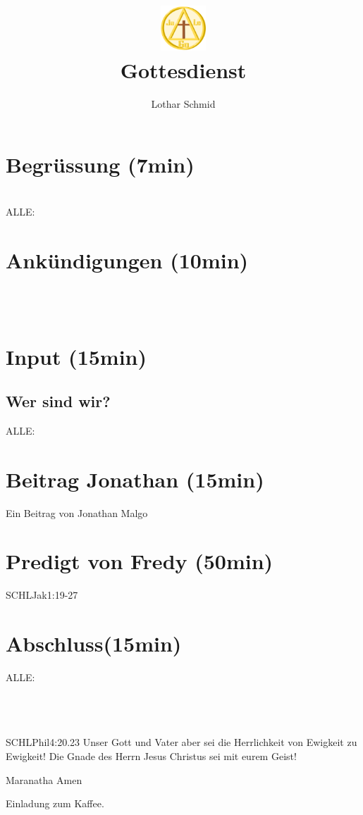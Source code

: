 \documentclass{../inc/mybib}
\title{\includegraphics[height=48pt]{../assets/images/logo.png}\\Gottesdienst}
\author{Lothar Schmid}
\begin{document}
\maketitle
\section{Begrüssung (7min)}
\beten{} \\
ALLE: 

\section{Ankündigungen (10min)}
\\
\\

\section{ Input (15min)}
\subsection{Wer sind wir?}

ALLE: 

\section{Beitrag Jonathan (15min)}
Ein Beitrag von Jonathan Malgo



\section{Predigt von Fredy (50min)}
\begin{bibeltext}{SCHL}{Jak}{1:19-27}
\end{bibeltext}

\section{Abschluss(15min)}
ALLE: \\
\beten{} \\
\\
\\
\begin{bibeltext}{SCHL}{Phil}{4:20.23}
Unser Gott und Vater aber sei die Herrlichkeit von Ewigkeit zu Ewigkeit!
Die Gnade des Herrn Jesus Christus sei mit eurem Geist!
\end{bibeltext}
Maranatha Amen

Einladung zum Kaffee.
\end{document}
